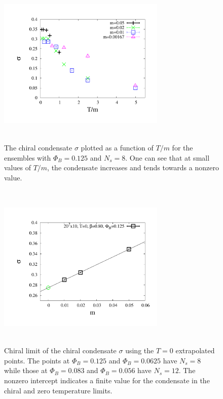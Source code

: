 \documentclass[aps,prd,twocolumn,showpacs,superscriptaddress,groupedaddress]{revtex4}  %
\begin{document}
\begin{figure}
 \includegraphics[height=8cm,width=8cm]{pbp_vs_TdivM_PHI0125_zoom_graphene_paper.pdf} \hspace{-1cm}
\caption{The chiral condensate $\sigma$ plotted as a function of $T/m$ for the ensembles with $\Phi_B=0.125$ and $N_s=8$. One can see that at small values of $T/m$, the condensate increases and tends towards a nonzero value.}
\label{PBPvsTdivM}
\end{figure}

\begin{figure}
  \includegraphics[height=8cm,width=8cm]{pbp_vs_m_zeroT_PHI0125_lin_graphene_paper.pdf} \hspace{-1cm}
\caption{Chiral limit of the chiral condensate $\sigma$ using the $T=0$ extrapolated points. The points at $\Phi_B=0.125$ and $\Phi_B=0.0625$ have $N_s=8$ while those at $\Phi_B=0.083$ and $\Phi_B=0.056$ have $N_s=12$. The nonzero intercept indicates a finite value for the condensate in the chiral and zero temperature limits.}
\label{PBPzeroTChiral}
\end{figure}
\end{document}
